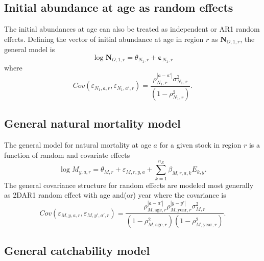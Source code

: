 \documentclass[
]{article}
\begin{document}
\hypertarget{initial-abundance-at-age-as-random-effects}{%
\subsection*{Initial abundance at age as random effects}\label{initial-abundance-at-age-as-random-effects}}

The initial abundances at age can also be treated as independent or AR1 random effects. Defining the vector of initial abundance at age in region \(r\) as \(\mathbf{N}_{O,1,r}\), the general model is
\begin{equation*}
\log \mathbf{N}_{O,1,r} = \theta_{N_1,r} + \boldsymbol{\varepsilon}_{N_1,r}
\end{equation*}
where
\begin{equation*}
Cov\left(\varepsilon_{N_1,a,r},\varepsilon_{N_1,a',r}\right) = \frac{\rho_{N_1,r}^{|a-a'|}\sigma^2_{N_1,r}} {\left(1-\rho_{N_1,r}^2\right)}.
\end{equation*}

\hypertarget{general-natural-mortality-model}{%
\subsection*{General natural mortality model}\label{general-natural-mortality-model}}

The general model for natural mortality at age \(a\) for a given stock in region \(r\) is a function of random and covariate effects
\begin{equation*}
  \log M_{y,a,r} = \theta_{M,r} + \varepsilon_{M,r,y,a} + \sum^{n_E}_{k=1} \beta_{M,r,a,k} E_{k,y}.
\end{equation*}
The general covariance structure for random effects are modeled most generally as 2DAR1 random effect with age and(or) year where the covariance is
\begin{equation*}
  Cov\left(\varepsilon_{M,y,a,r},\varepsilon_{M,y',a',r}\right) =   \frac{\rho_{M,\text{age},r}^{|a-a'|}\rho_{M,\text{year},r}^{|y-y'|}\sigma^2_{M,r}}{\left(1 -  \rho_{M,\text{age},r}^2\right)\left(1 - \rho_{M,\text{year},r}^2\right)}.
\end{equation*}

\hypertarget{general-catchability-model}{%
\subsection*{General catchability model}\label{general-catchability-model}}
\end{document}
